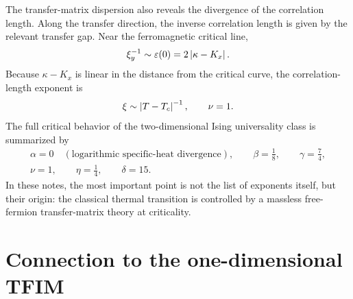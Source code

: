 The transfer-matrix dispersion also reveals the divergence of the correlation
length.  Along the transfer direction, the inverse correlation length is given by
the relevant transfer gap.  Near the ferromagnetic critical line,
\begin{equation}
\label{eq:2d-classical-ising-correlation-length-gap}
    \xi_y^{-1}\sim\varepsilon(0)=2\left|\kappa-K_x\right| .
\end{equation}
Because $\kappa-K_x$ is linear in the distance from the critical curve, the
correlation-length exponent is
\begin{equation}
\label{eq:2d-classical-ising-nu-exponent}
    \xi\sim\left|T-T_c\right|^{-1},
    \qquad
    \nu=1 .
\end{equation}
The full critical behavior of the two-dimensional Ising universality class is
summarized by
\begin{equation}
\label{eq:2d-classical-ising-critical-exponents}
\begin{gathered}
    \alpha=0\quad(\text{logarithmic specific-heat divergence}),
    \qquad
    \beta=\frac18,
    \qquad
    \gamma=\frac74,
    \\
    \nu=1,
    \qquad
    \eta=\frac14,
    \qquad
    \delta=15 .
\end{gathered}
\end{equation}
In these notes, the most important point is not the list of exponents itself,
but their origin: the classical thermal transition is controlled by a massless
free-fermion transfer-matrix theory at criticality.

\section{Connection to the one-dimensional TFIM}
\label{sec:2d-classical-ising-connection-to-tfim}

